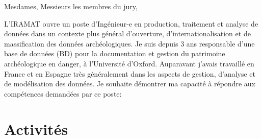 \documentclass[12pt]{article}
\begin{document}
Mesdames, Messieurs les membres du jury,

L'IRAMAT ouvre un poste d'Ingénieur-e en production, traitement et analyse de données dans un contexte plus général
d'ouverture, d'internationalisation et de massification des données archéologiques. Je suis depuis 3 ans responsable d'une
base de données (BD) pour la documentation et gestion du patrimoine archéologique en danger, à l'Université d'Oxford.
Auparavant j'avais travaillé en France et en Espagne très généralement dans les aspects de gestion, d'analyse et de
modélisation des données. Je souhaite démontrer ma capacité à répondre aux compétences demandées par ce
poste:

\section*{Activités}
\end{document}
